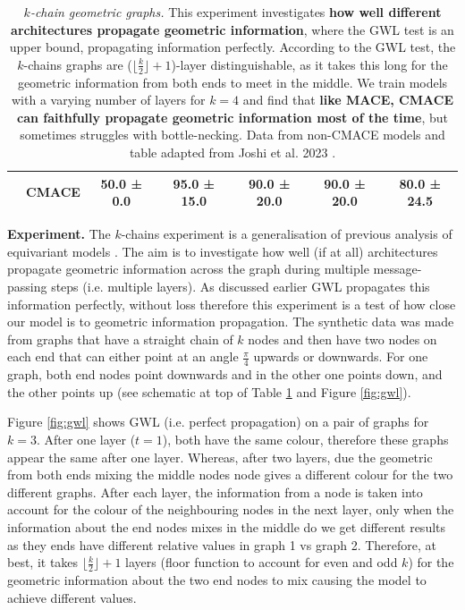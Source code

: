 \begin{table}[H]
{\begin{tabular}{clccccc}
        & CMACE & 50.0 ± 0.0 & \cellcolor{green!10} \textbf{95.0 ± 15.0} & \cellcolor{green!10} \textbf{90.0 ± 20.0} & \cellcolor{green!10} \textbf{90.0 ± 20.0} & \cellcolor{green!10} \textbf{80.0 ± 24.5} \\
        \bottomrule
    \end{tabular}
    }
    \caption{\textit{$k$-chain geometric graphs.} This experiment investigates \textbf{how well different architectures propagate geometric information}, where the GWL test is an upper bound, propagating information perfectly. According to the GWL test, the $k$-chains graphs are ($\lfloor \frac k 2 \rfloor +1$)-layer distinguishable, as it takes this long for the geometric information from both ends to meet in the middle. We train models with a varying number of layers for $k=4$ and find that \textbf{like MACE, CMACE can faithfully propagate geometric information most of the time}, but sometimes struggles with bottle-necking. Data from non-CMACE models and table adapted from Joshi et al. 2023 \cite{joshi2023expressive}.
    }
    
    \label{tab:kchains}
\end{table}

\textbf{Experiment.} The $k$-chains experiment is a generalisation of previous analysis of equivariant models \cite{schutt2021equivariant}. The aim is to investigate how well (if at all) architectures propagate geometric information across the graph during multiple message-passing steps (i.e. multiple layers). As discussed earlier GWL propagates this information perfectly, without loss therefore this experiment is a test of how close our model is to geometric information propagation. The synthetic data was made from graphs that have a straight chain of $k$ nodes and then have two nodes on each end that can either point at an angle $\frac \pi 4$ upwards or downwards. For one graph, both end nodes point downwards and in the other one points down, and the other points up (see schematic at top of Table \ref{tab:kchains} and Figure \ref{fig:gwl}). 

Figure \ref{fig:gwl} shows GWL (i.e. perfect propagation) on a pair of graphs for $k=3$. After one layer ($t=1$), both have the same colour, therefore these graphs appear the same after one layer. Whereas, after two layers, due the geometric from both ends mixing the middle nodes node gives a different colour for the two different graphs. After each layer, the information from a node is taken into account for the colour of the neighbouring nodes in the next layer, only when the information about the end nodes mixes in the middle do we get different results as they ends have different relative values in graph 1 vs graph 2. Therefore, at best, it takes $\lfloor \frac k 2 \rfloor + 1$ layers (floor function to account for even and odd $k$) for the geometric information about the two end nodes to mix causing the model to achieve different values.

